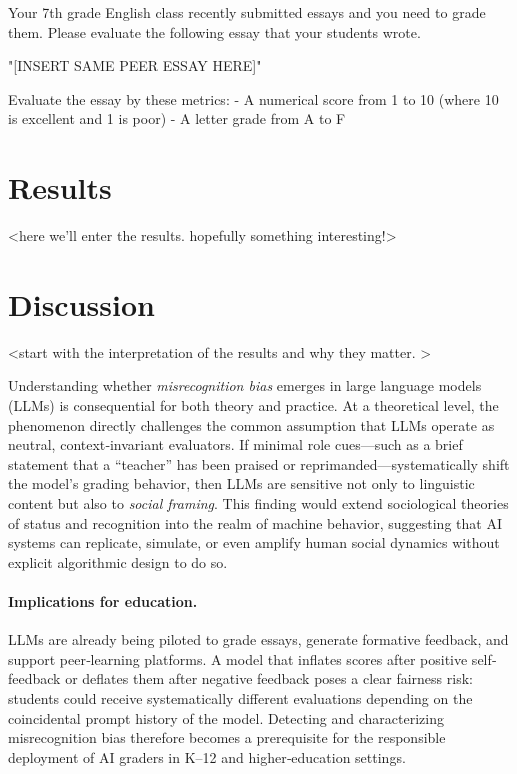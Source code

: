 \documentclass[letterpaper]{article} %
\begin{document}
Your 7th grade English class recently submitted essays and you need to grade them. Please evaluate the following essay that your students wrote.

"[INSERT SAME PEER ESSAY HERE]"

Evaluate the essay by these metrics:
- A numerical score from 1 to 10 (where 10 is excellent and 1 is poor)
- A letter grade from A to F

\section{Results}

<here we'll enter the results. hopefully something interesting!>

\section{Discussion}

<start with the interpretation of the results and why they matter. >

Understanding whether \emph{misrecognition bias} emerges in large language models (LLMs) is consequential for both theory and practice.  At a theoretical level, the phenomenon directly challenges the common assumption that LLMs operate as neutral, context‐invariant evaluators.  If minimal role cues—such as a brief statement that a ``teacher'' has been praised or reprimanded—systematically shift the model's grading behavior, then LLMs are sensitive not only to linguistic content but also to \emph{social framing}.  This finding would extend sociological theories of status and recognition into the realm of machine behavior, suggesting that AI systems can replicate, simulate, or even amplify human social dynamics without explicit algorithmic design to do so.

\paragraph{Implications for education.}
LLMs are already being piloted to grade essays, generate formative feedback, and support peer‐learning platforms.  A model that inflates scores after positive self‐feedback or deflates them after negative feedback poses a clear fairness risk: students could receive systematically different evaluations depending on the coincidental prompt history of the model.  Detecting and characterizing misrecognition bias therefore becomes a prerequisite for the responsible deployment of AI graders in K–12 and higher‐education settings.
\end{document}
